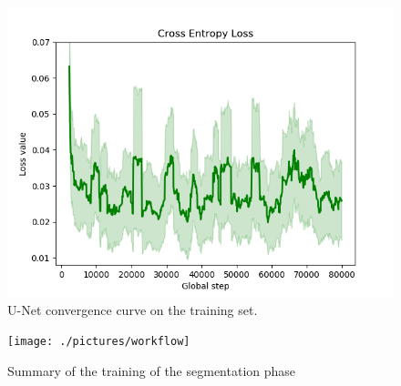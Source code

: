 \begin{figure}[b!]
    \centering
    \captionsetup{justification=centering}
    \includegraphics[width=\textwidth]{./pictures/cross-entropy-loss}
    \caption{U-Net convergence curve on the training set.}
    \label{fig:cross-entropy-loss}
\end{figure}
\clearpage
\begin{figure}[h]
    \centering
    \captionsetup{justification=centering}
    \texttt{[image: ./pictures/workflow]}
    \caption{Summary of the training of the segmentation phase}
    \label{fig:workflow}
\end{figure}
\clearpage

